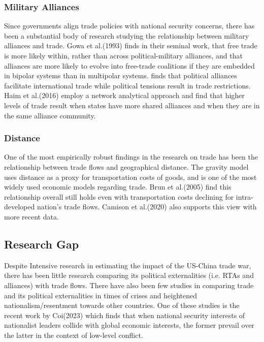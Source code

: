 \documentclass[a4paper, 12pt]{article}
\begin{document}
\subsubsection{Military Alliances}
Since governments align trade policies with national security concerns, there has been a substantial body of research studying the relationship between military alliances and trade.
Gowa et al.(1993)\cite{gowa1993} finds in their seminal work, that free trade is more likely within, rather than across political-military alliances, and that alliances are more likely to evolve into free-trade coalitions if they are embedded in bipolar systems than in multipolar systems.
finds that political alliances facilitate international trade while political tensions result in trade restrictions.
Haim et al.(2016)\cite{haim2016} employ a network analytical approach and find that higher levels of trade result when states have more shared alliances and when they are in the same alliance community.

\subsubsection{Distance}
One of the most empirically robust findings in the research on trade has been the relationship between trade flows and geographical distance.
The gravity model uses distance as a proxy for transportation costs of goods, and is one of the most widely used economic models regarding trade. 
Brun et al.(2005)\cite{brun2005} find this relationship overall still holds even with transportation costs declining for intra-developed nation’s trade flows.
Camison et al.(2020)\cite{camison2020} also supports this view with more recent data.


\subsection{Research Gap}
Despite Intensive research in estimating the impact of the US-China trade war, there has been little research comparing its political externalities (i.e. RTAs and alliances) with trade flows.
There have also been few studies in comparing trade and its political externalities in times of crises and heightened nationalism/resentment towards other countries.
One of these studies is the recent work by Coi(2023)\cite{Coi2023} which finds that when national security interests of nationalist leaders collide with global economic interests, the former prevail over the latter in the context of low-level conflict.
\end{document}
